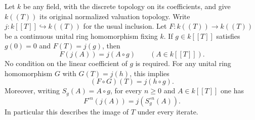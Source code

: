 \begin{theorem}
\label{fw:laurent-power-series-substitution}
\leanok
Let $k$ be any field, with the discrete topology on its coefficients,
and give $k((T))$ its original normalized valuation topology.
Write $j:k[[T]]\hookrightarrow k((T))$ for the usual inclusion.
Let $F:k((T))\to k((T))$ be a continuous unital ring homomorphism
fixing $k$. If $g\in k[[T]]$ satisfies $g(0)=0$ and $F(T)=j(g)$, then
\[
 F(j(A))=j(A\circ g)\qquad(A\in k[[T]]).
\]
No condition on the linear coefficient of $g$ is required.
For any unital ring homomorphism $G$ with $G(T)=j(h)$, this implies
\[
 (F\circ G)(T)=j(h\circ g).
\]
Moreover, writing $S_g(A)=A\circ g$, for every $n\geq0$ and $A\in k[[T]]$
one has
\[
 F^{\circ n}(j(A))=j(S_g^{\circ n}(A)).
\]
In particular this describes the image of $T$ under every iterate.
\end{theorem}
